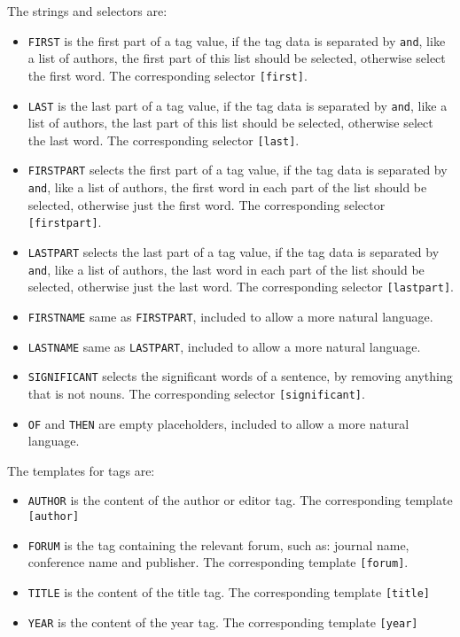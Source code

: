 The strings and selectors are:

\begin{itemize}
\item \texttt{FIRST} is the first part of a tag value, if the tag data
  is separated by \texttt{and}, like a list of authors, the first part
  of this list should be selected, otherwise select the first word.
  The corresponding selector \texttt{[first]}.
\item \texttt{LAST} is the last part of a tag value, if the tag data
  is separated by \texttt{and}, like a list of authors, the last part
  of this list should be selected, otherwise select the last word.
  The corresponding selector \texttt{[last]}.
\item \texttt{FIRSTPART} selects the first part of a tag value, if the
  tag data is separated by \texttt{and}, like a list of authors, the
  first word in each part of the list should be selected, otherwise
  just the first word.  The corresponding selector
  \texttt{[firstpart]}.
\item \texttt{LASTPART} selects the last part of a tag value, if the
  tag data is separated by \texttt{and}, like a list of authors, the
  last word in each part of the list should be selected, otherwise
  just the last word.  The corresponding selector \texttt{[lastpart]}.
\item \texttt{FIRSTNAME} same as \texttt{FIRSTPART}, included to allow
  a more natural language.
\item \texttt{LASTNAME} same as \texttt{LASTPART}, included to allow
  a more natural language.
\item \texttt{SIGNIFICANT} selects the significant words of a
  sentence, by removing anything that is not nouns.  The
  corresponding selector \texttt{[significant]}.
\item \texttt{OF} and \texttt{THEN} are empty placeholders, included
  to allow a more natural language.
\end{itemize}

The templates for tags are:

\begin{itemize}
\item \texttt{AUTHOR} is the content of the author or editor tag.  The
  corresponding template \texttt{[author]}
\item \texttt{FORUM} is the tag containing the relevant forum, such
  as: journal name, conference name and publisher.  The corresponding
  template \texttt{[forum]}.
\item \texttt{TITLE} is the content of the title tag.  The
  corresponding template \texttt{[title]}
\item \texttt{YEAR} is the content of the year tag.  The corresponding
  template \texttt{[year]}
\end{itemize}

